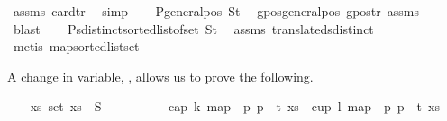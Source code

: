 \begin{isabellebody}
\ assms{\isacharparenleft}{\kern0pt}{}{\isacharcomma}{\kern0pt}{}{\isacharparenright}{\kern0pt}\ card{\isacharunderscore}{\kern0pt}tr\ \isamarkupfalse%
\ simp\isanewline
\isanewline
\ \ \isamarkupfalse%
\ P{}{\isacharcolon}{\kern0pt}{\isachardoublequoteopen}general{\isacharunderscore}{\kern0pt}pos\ St{\isachardoublequoteclose}\ \isamarkupfalse%
\ gpos{\isacharunderscore}{\kern0pt}generalpos\ gpos{\isacharunderscore}{\kern0pt}tr\ assms{\isacharparenleft}{\kern0pt}{}{\isacharcomma}{\kern0pt}{}{\isacharparenright}{\kern0pt}\ \isamarkupfalse%
\ blast\isanewline
\isanewline
\ \ \isamarkupfalse%
\ P{}{\isacharcolon}{\kern0pt}{\isachardoublequoteopen}sdistinct{\isacharparenleft}{\kern0pt}sorted{\isacharunderscore}{\kern0pt}list{\isacharunderscore}{\kern0pt}of{\isacharunderscore}{\kern0pt}set\ St{\isacharparenright}{\kern0pt}{\isachardoublequoteclose}\ \isamarkupfalse%
\ assms{\isacharparenleft}{\kern0pt}{}{\isacharcomma}{\kern0pt}{}{\isacharparenright}{\kern0pt}\ translated{\isacharunderscore}{\kern0pt}sdistinct\isanewline
\ \ \ \ \isamarkupfalse%
\ {\isacharparenleft}{\kern0pt}metis\ map{\isacharunderscore}{\kern0pt}sorted{\isacharunderscore}{\kern0pt}list{\isacharunderscore}{\kern0pt}set{\isacharparenright}{\kern0pt}%
\begin{isamarkuptext}%
A change in variable, , allows us to prove the following.%
\end{isamarkuptext}\isamarkuptrue%
\ \ \isamarkupfalse%
\ {\isachardoublequoteopen}{\isasymforall}xs{\isachardot}{\kern0pt}\ set\ xs\ {\isasymsubseteq}\ S\ {\isasymlongrightarrow}\ \isanewline
\ \ \ \ \ \ \ \ {\isasymnot}{\isacharparenleft}{\kern0pt}cap\ k\ {\isacharparenleft}{\kern0pt}map\ {\isacharparenleft}{\kern0pt}{\isasymlambda}\ p{\isachardot}{\kern0pt}\ p\ {\isacharplus}{\kern0pt}\ t{\isacharparenright}{\kern0pt}\ xs{\isacharparenright}{\kern0pt}\ {\isasymor}\ cup\ l\ {\isacharparenleft}{\kern0pt}map\ {\isacharparenleft}{\kern0pt}{\isasymlambda}\ p{\isachardot}{\kern0pt}\ p\ {\isacharplus}{\kern0pt}\ t{\isacharparenright}{\kern0pt}\ xs{\isacharparenright}{\kern0pt}{\isacharparenright}{\kern0pt}{\isachardoublequoteclose}\ \isanewline

\end{isabellebody}
